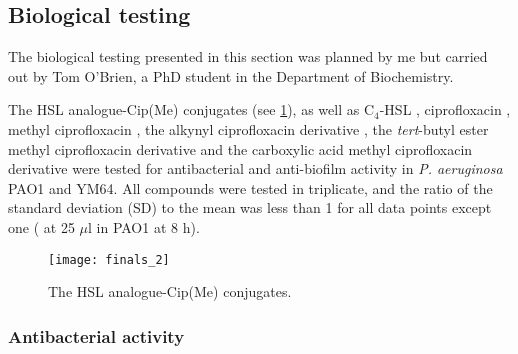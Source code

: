 \subsection{Biological testing\label{sec:bio2}}

The biological testing presented in this section was planned by me but carried out by Tom O'Brien, a PhD student in the Department of Biochemistry.

The HSL analogue-Cip(Me) conjugates (see \ref{fgr:finals_2}), as well as C$_4$-HSL , ciprofloxacin , methyl ciprofloxacin , the alkynyl ciprofloxacin derivative , the \textit{tert}-butyl ester methyl ciprofloxacin derivative  and the carboxylic acid methyl ciprofloxacin derivative  were tested for antibacterial and anti-biofilm activity in \textit{P. aeruginosa} PAO1\cite{Stover2000} and YM64\cite{Morita2001}.
All compounds were tested in triplicate, and the ratio of the standard deviation (SD) to the mean was less than 1 for all data points except one ( at 25 $\mu$l in PAO1 at 8 h).

\begin{figure}[H]
	\begin{center}
		\texttt{[image: finals\_2]}
		\caption{The HSL analogue-Cip(Me) conjugates.
 		\label{fgr:finals_2}}
	\end{center}
\end{figure}

\subsubsection{Antibacterial activity}

